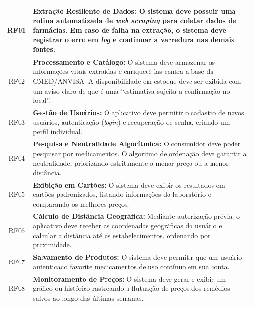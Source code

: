 \begin{xltabular}{\textwidth}{|c|Y|}
        RF01 & \textbf{Extração Resiliente de Dados:} O sistema deve possuir uma rotina automatizada de \textit{web scraping} para coletar dados de farmácias. Em caso de falha na extração, o sistema deve registrar o erro em \textit{log} e continuar a varredura nas demais fontes. \\
        \hline
        RF02 & \textbf{Processamento e Catálogo:} O sistema deve armazenar as informações vitais extraídas e enriquecê-las contra a base da CMED/ANVISA. A disponibilidade em estoque deve ser exibida com um aviso claro de que é uma ``estimativa sujeita a confirmação no local''. \\
        \hline
        RF03 & \textbf{Gestão de Usuários:} O aplicativo deve permitir o cadastro de novos usuários, autenticação (\textit{login}) e recuperação de senha, criando um perfil individual. \\
        \hline
        RF04 & \textbf{Pesquisa e Neutralidade Algorítmica:} O consumidor deve poder pesquisar por medicamentos. O algoritmo de ordenação deve garantir a neutralidade, priorizando estritamente o menor preço ou a menor distância. \\
        \hline
        RF05 & \textbf{Exibição em Cartões:} O sistema deve exibir os resultados em cartões padronizados, listando informações do laboratório e comparando os melhores preços. \\
        \hline
        RF06 & \textbf{Cálculo de Distância Geográfica:} Mediante autorização prévia, o aplicativo deve receber as coordenadas geográficas do usuário e calcular a distância até os estabelecimentos, ordenando por proximidade. \\
        \hline
        RF07 & \textbf{Salvamento de Produtos:} O sistema deve permitir que um usuário autenticado favorite medicamentos de uso contínuo em sua conta. \\
        \hline
        RF08 & \textbf{Monitoramento de Preços:} O sistema deve gerar e exibir um gráfico ou histórico rastreando a flutuação de preços dos remédios salvos ao longo das últimas semanas. \\
        \hline
    \end{xltabular}
\endgroup

\vspace{0.5cm}


